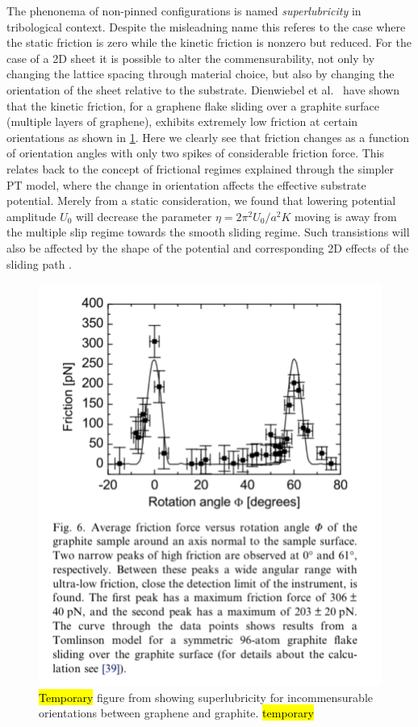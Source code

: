 The phenonema of non-pinned configurations is named \textit{superlubricity} in
tribological context. Despite the misleadning name this referes to the case
where the static friction is zero while the kinetic friction is nonzero but
reduced. For the case of a 2D sheet it is possible to alter the
commensurability, not only by changing the lattice spacing through material
choice, but also by changing the orientation of the sheet relative to the
substrate. Dienwiebel et al.\ \cite{DIENWIEBEL2005197} have shown that the
kinetic friction, for a graphene flake sliding over a graphite surface (multiple
layers of graphene), exhibits extremely low friction at certain orientations as
shown in \cref{fig:graphene_rot}. Here we clearly see that friction changes as a
function of orientation angles with only two spikes of considerable friction
force. This relates back to the concept of frictional regimes explained through
the simpler \acrshort{PT} model, where the change in orientation affects the
effective substrate potential. Merely from a static consideration, we found that
lowering potential amplitude $U_0$ will decrease the parameter $\eta =
2\pi^2U_0/a^2K$ moving is away from the multiple slip regime towards the smooth
sliding regime. Such transistions will also be affected by the shape of the
potential and corresponding 2D effects of the sliding path \cite{Yalin_2011}.

\begin{figure}[H]
  \centering
  \includegraphics[width=0.5\linewidth]{figures/theory/graphene_rot.png}
  \caption{\hl{Temporary} figure from \cite{DIENWIEBEL2005197} showing superlubricity for incommensurable orientations between graphene and graphite. \hl{temporary}}
  \label{fig:graphene_rot}
\end{figure}




